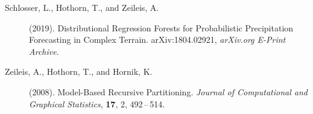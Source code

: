 \documentclass[twoside]{report}
\begin{document}
\begin{description}

\item[Schlosser, L., Hothorn, T., and Zeileis, A.] (2019).
     Distributional Regression Forests for Probabilistic Precipitation Forecasting in Complex Terrain.
     arXiv:1804.02921, {\it arXiv.org E-Print Archive}.

\item[Zeileis, A., Hothorn, T., and Hornik, K.] (2008).
     Model-Based Recursive Partitioning.
     {\it Journal of Computational and Graphical Statistics}, {\bf 17}, 2,
     492\,--\,514. 
     
\end{description}
\end{document}
